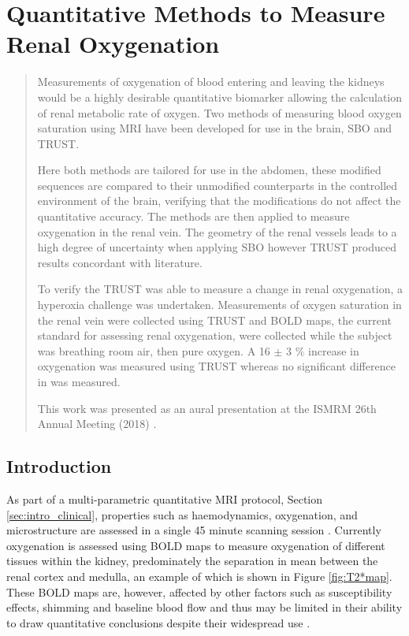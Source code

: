 \chapter{Quantitative Methods to Measure Renal Oxygenation}
\label{chap:TRUST}

\begin{abstract}
	Measurements of oxygenation of blood entering and leaving the kidneys would be a highly desirable quantitative biomarker allowing the calculation of renal metabolic rate of oxygen. Two methods of measuring blood oxygen saturation using \acs{MRI} have been developed for use in the brain,  \ac{SBO} and \ac{TRUST}.
	
	Here both methods are tailored for use in the abdomen, these modified sequences are compared to their unmodified counterparts in the controlled environment of the brain, verifying that the modifications do not affect the quantitative accuracy. The methods are then applied to measure oxygenation in the renal vein. The geometry of the renal vessels leads to a high degree of uncertainty when applying \ac{SBO} however \ac{TRUST} produced results concordant with literature.
	
	To verify the \ac{TRUST} was able to measure a change in renal oxygenation, a hyperoxia challenge was undertaken. Measurements of oxygen saturation in the renal vein were collected using \ac{TRUST} and \acs{BOLD} \ttwostar maps, the current standard for assessing renal oxygenation, were collected while the subject was breathing room air, then pure oxygen. A 16 $\pm$ 3 \% increase in oxygenation was measured using \ac{TRUST} whereas no significant difference in \ttwostar was measured. 
	
	This work was presented as an aural presentation at the \ac{ISMRM} 26th Annual Meeting (2018) \cite{daniel_applying_2018}.
	
\end{abstract}
\newpage
\acresetall

\section{Introduction}
As part of a multi-parametric quantitative \ac{MRI} protocol, Section \ref{sec:intro_clinical}, properties such as haemodynamics, oxygenation, and microstructure are assessed in a single 45 minute scanning session \cite{cox_multiparametric_2017, buchanan_quantitative_2019}. Currently oxygenation is assessed using \ac{BOLD} \ttwostar maps to measure oxygenation of different tissues within the kidney, predominately the separation in mean \ttwostar between the renal cortex and medulla, an example of which is shown in Figure \ref{fig:T2*map}. These \ac{BOLD} \ttwostar maps are, however, affected by other factors such as susceptibility effects, shimming and baseline blood flow and thus may be limited in their ability to draw quantitative conclusions despite their widespread use \cite{pruijm_blood_2017, niendorf_how_nodate}. 


